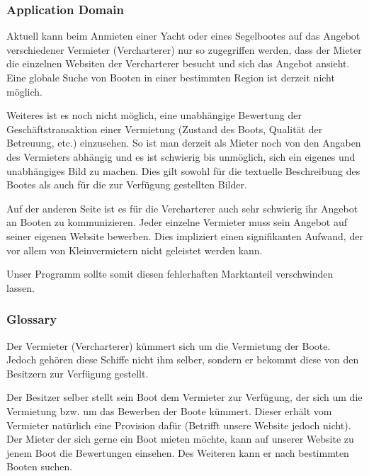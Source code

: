 \documentclass[12pt]{article}
\theoremstyle{definition}
\begin{document}
\subsubsection{Application Domain}
	Aktuell kann beim Anmieten einer Yacht oder eines Segelbootes auf das Angebot verschiedener Vermieter (Vercharterer) nur so zugegriffen werden, dass der Mieter die einzelnen Websiten der Vercharterer besucht und sich das Angebot ansieht. Eine globale Suche von Booten in einer bestimmten Region ist derzeit nicht möglich. 

	Weiteres ist es noch nicht möglich, eine unabhängige Bewertung der Geschäfts\-trans\-aktion einer Vermietung (Zustand des Boots, Qualität der Betreuung, etc.) einzusehen. So ist man derzeit als Mieter noch von den Angaben des Vermieters abhängig und es ist schwierig bis unmöglich, sich ein eigenes und unabhängiges Bild zu machen. Dies gilt sowohl für die textuelle Beschreibung des Bootes als auch für die zur Verfügung gestellten Bilder.
	
	Auf der anderen Seite ist es für die Vercharterer auch sehr schwierig ihr Angebot an Booten zu kommunizieren. Jeder einzelne Vermieter muss sein Angebot auf seiner eigenen Website bewerben. Dies impliziert einen signifikanten Aufwand, der vor allem von Kleinvermietern nicht geleistet werden kann. 
	
	Unser Programm sollte somit diesen fehlerhaften Marktanteil verschwinden lassen.

\subsubsection{Glossary}
	Der Vermieter (Vercharterer) kümmert sich um die Vermietung der Boote. Jedoch gehören diese Schiffe nicht ihm selber, sondern er bekommt diese von den Besitzern zur Verfügung gestellt.

	Der Besitzer selber stellt sein Boot dem Vermieter zur Verfügung, der sich um die Vermietung bzw. um das Bewerben der Boote kümmert. Dieser erhält vom Vermieter natürlich eine Provision dafür (Betrifft unsere Website jedoch nicht).
	Der Mieter der sich gerne ein Boot mieten möchte, kann auf unserer Website zu jenem Boot die Bewertungen einsehen. Des Weiteren kann er nach bestimmten Booten suchen.
\end{document}
